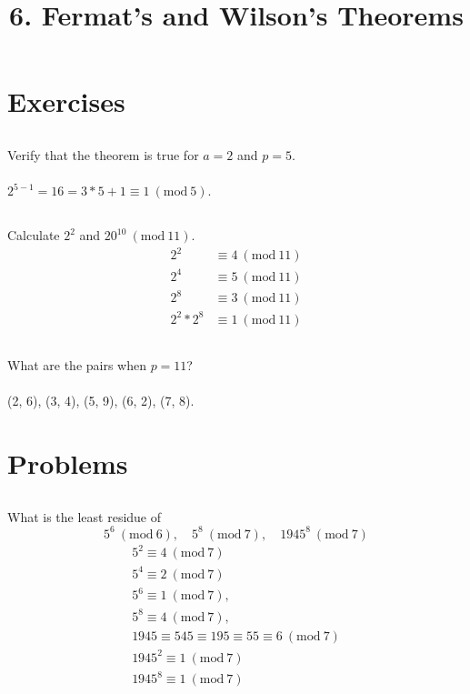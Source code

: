 \documentclass{article}
\begin{document}
\newcommand{\Z}{\mathbb{Z}}
\newcommand{\Mod}[1]{\ (\mathrm{mod}\ #1)}

\title{6. Fermat's and Wilson's Theorems}
\section{Exercises}

\subsection{}
Verify that the theorem is true for $a = 2$ and $p = 5$.\\~\\
$2^{5 - 1} = 16 = 3 * 5 + 1 \equiv 1 \Mod{5}$.

\subsection{}
Calculate $2^2$ and $20^{10} \Mod{11}$.
\begin{align*}
    2^2 &\equiv 4 \Mod{11}\\
    2^4 &\equiv 5 \Mod{11}\\
    2^8 &\equiv 3 \Mod{11}\\
    2^2 * 2^8 &\equiv 1 \Mod{11}
\end{align*}

\subsection{}
What are the pairs when $p = 11$?\\~\\
(2, 6), (3, 4), (5, 9), (6, 2), (7, 8).


\section{Problems}

\subsection{}
What is the least residue of
\begin{equation*}
    5^6 \Mod{6}, \quad 5^8 \Mod{7}, \quad 1945^8 \Mod{7}
\end{equation*}
\begin{gather*}
    5^2 \equiv 4 \Mod{7}\\
    5^4 \equiv 2 \Mod{7}\\
    5^6 \equiv 1 \Mod{7},\\
    5^8 \equiv 4 \Mod{7},\\
    1945 \equiv 545 \equiv 195 \equiv 55 \equiv 6 \Mod{7}\\
    1945^2 \equiv 1 \Mod{7}\\
    1945^8 \equiv 1 \Mod{7}
\end{gather*}
\end{document}
